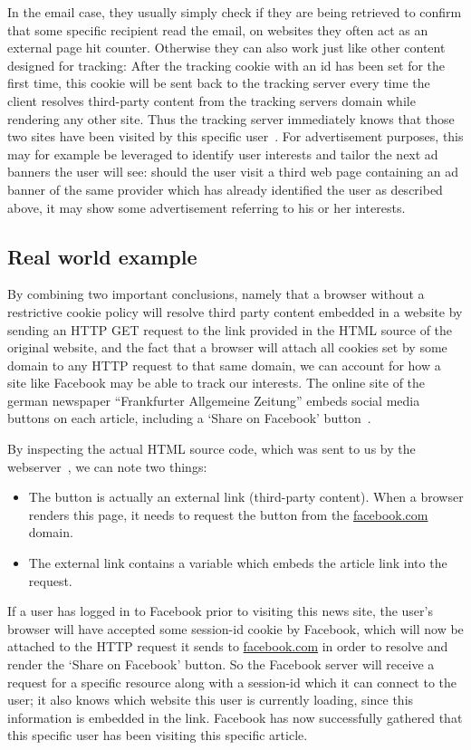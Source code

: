 
In the email case, they usually simply check if they are being retrieved to confirm that some specific recipient read the email,
on websites they often act as an external page hit counter.
Otherwise they can also work just like other content designed for tracking:
After the tracking cookie with an id has been set for the first time,
this cookie will be sent back to the tracking server every time the client resolves third-party content from the tracking servers domain while rendering any other site.
Thus the tracking server immediately knows that those two sites have been visited by this specific user~\cite[Section~7.1]{RFC6265}.
For advertisement purposes, this may for example be leveraged to identify user interests and tailor the next ad banners the user will see:
should the user visit a third web page containing an ad banner of the same provider which has already identified the user as described above,
it may show some advertisement referring to his or her interests.

\subsection{Real world example}\label{section:tech-example}
By combining two important conclusions,
namely that a browser without a restrictive cookie policy will resolve third party content embedded in a website by sending an HTTP GET request to the link provided in the HTML source of the original website, and the fact that a browser will attach all cookies set by some domain to any HTTP request to that same domain, %
we can account for how a site like Facebook may be able to track our interests.
The online site of the german newspaper ``Frankfurter Allgemeine Zeitung'' embeds social media buttons on each article, including a `Share on Facebook' button~.

By inspecting the actual HTML source code, which was sent to us by the webserver~, we can note two things:

\begin{itemize}
\item The button is actually an external link (third-party content). When a browser renders this page, it needs to request the button from the \url{facebook.com} domain.
\item The external link contains a variable which embeds the article link into the request.
\end{itemize}
If a user has logged in to Facebook prior to visiting this news site, the user's browser will have accepted some session-id cookie by Facebook,
which will now be attached to the HTTP request it sends to \url{facebook.com} in order to resolve and render the `Share on Facebook' button.
So the Facebook server will receive a request for a specific resource along with a session-id which it can connect to the user;
it also knows which website this user is currently loading, since this information is embedded in the link.
Facebook has now successfully gathered that this specific user has been visiting this specific article.

